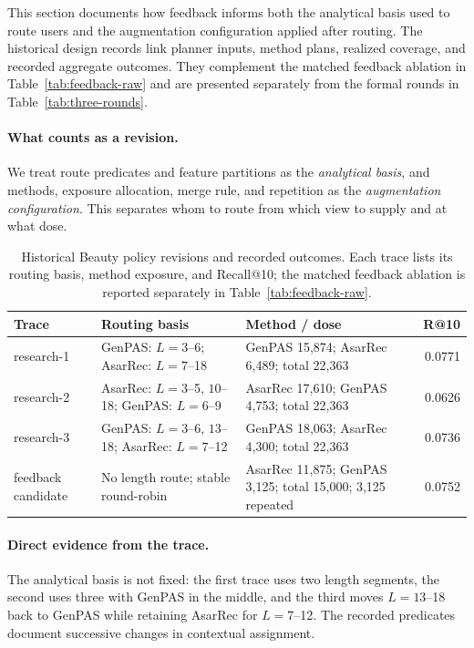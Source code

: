 This section documents how feedback informs both the analytical basis
used to route users and the augmentation configuration applied after
routing. The historical design records link planner inputs, method
plans, realized coverage, and recorded aggregate outcomes. They complement
the matched feedback ablation in Table~\ref{tab:feedback-raw} and are
presented separately from the formal rounds in Table~\ref{tab:three-rounds}.

\paragraph{What counts as a revision.}
We treat route predicates and feature partitions as the \emph{analytical
basis}, and methods, exposure allocation, merge rule, and repetition as the
\emph{augmentation configuration}. This separates whom to route from which
view to supply and at what dose.

\begin{table}[H]
\centering
\caption{Historical Beauty policy revisions and recorded outcomes. Each trace lists its routing basis, method exposure, and Recall@10; the matched feedback ablation is reported separately in Table~\ref{tab:feedback-raw}.}
\label{tab:policy-revision-trace}
\small
\renewcommand{\arraystretch}{1.08}
\setlength{\tabcolsep}{3pt}
\begin{tabular}{@{}>{\raggedright\arraybackslash}p{}
                >{\raggedright\arraybackslash}p{}
                >{\raggedright\arraybackslash}p{}
                r@{}}
\toprule
Trace & Routing basis & Method / dose & R@10 \\
\midrule
research-1 &
GenPAS: $L=3$--6; AsarRec: $L=7$--18 &
GenPAS 15,874; AsarRec 6,489; total 22,363 &
0.0771 \\
research-2 &
AsarRec: $L=3$--5, $10$--18; GenPAS: $L=6$--9 &
AsarRec 17,610; GenPAS 4,753; total 22,363 &
0.0626 \\
research-3 &
GenPAS: $L=3$--6, $13$--18; AsarRec: $L=7$--12 &
GenPAS 18,063; AsarRec 4,300; total 22,363 &
0.0736 \\
feedback candidate &
No length route; stable round-robin &
AsarRec 11,875; GenPAS 3,125; total 15,000; 3,125 repeated &
0.0752 \\
\bottomrule
\end{tabular}
\end{table}

\paragraph{Direct evidence from the trace.}
The analytical basis is not fixed: the first trace uses two length segments,
the second uses three with GenPAS in the middle, and the third moves
$L=13$--18 back to GenPAS while retaining AsarRec for $L=7$--12. The recorded
predicates document successive changes in contextual assignment.

